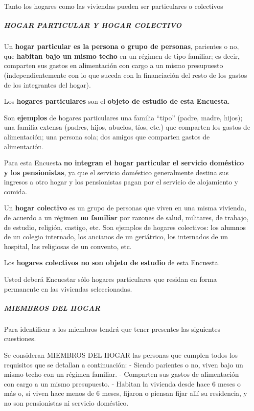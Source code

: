 \documentclass[
  openany]{book}
\begin{document}
Tanto los hogares como las viviendas pueden ser particulares o colectivos

\hypertarget{hogar-particular-y-hogar-colectivo}{%
\subparagraph{\texorpdfstring{\textbf{HOGAR PARTICULAR Y HOGAR COLECTIVO}}{HOGAR PARTICULAR Y HOGAR COLECTIVO}}\label{hogar-particular-y-hogar-colectivo}}

Un \textbf{hogar particular es la persona o grupo de personas}, parientes o no, que \textbf{habitan bajo un mismo techo} en un régimen de tipo familiar; es decir, comparten sus gastos en alimentación con cargo a un mismo presupuesto (independientemente con lo que suceda con la financiación del resto de los gastos de los integrantes del hogar).

Los \textbf{hogares particulares} son el \textbf{objeto de estudio de esta Encuesta.}

Son \textbf{ejemplos} de hogares particulares una familia ``tipo'' (padre, madre, hijos); una familia extensa (padres, hijos, abuelos, tíos, etc.) que comparten los gastos de alimentación; una persona sola; dos amigos que comparten gastos de alimentación.

Para esta Encuesta \textbf{no integran el hogar particular el servicio doméstico y los pensionistas}, ya que el servicio doméstico generalmente destina sus ingresos a otro hogar y los pensionistas pagan por el servicio de alojamiento y comida.

Un \textbf{hogar colectivo} es un grupo de personas que viven en una misma vivienda, de acuerdo a un régimen \textbf{no familiar} por razones de salud, militares, de trabajo, de estudio, religión, castigo, etc. Son ejemplos de hogares colectivos: los alumnos de un colegio internado, los ancianos de un geriátrico, los internados de un hospital, las religiosas de un convento, etc.

Los \textbf{hogares colectivos no son objeto de estudio} de esta Encuesta.

Usted deberá Encuestar sólo hogares particulares que residan en forma permanente en las viviendas seleccionadas.

\hypertarget{miembros-del-hogar}{%
\subparagraph{\texorpdfstring{\textbf{MIEMBROS DEL HOGAR}}{MIEMBROS DEL HOGAR}}\label{miembros-del-hogar}}

Para identificar a los miembros tendrá que tener presentes las siguientes cuestiones.

Se consideran MIEMBROS DEL HOGAR las personas que cumplen todos los requisitos que se detallan a continuación: - Siendo parientes o no, viven bajo un mismo techo con un régimen familiar. - Comparten sus gastos de alimentación con cargo a un mismo presupuesto. - Habitan la vivienda desde hace 6 meses o más o, si viven hace menos de 6 meses, fijaron o piensan fijar allí su residencia, y no son pensionistas ni servicio doméstico.
\end{document}
